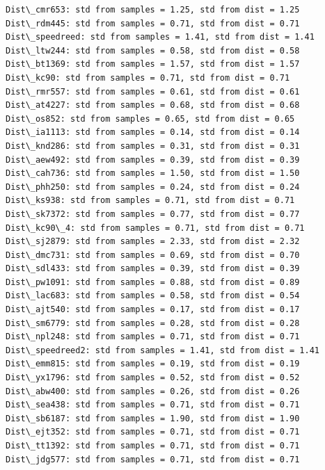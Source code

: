 \documentclass[11pt]{article}
\begin{document}
    \begin{Verbatim}[commandchars=\\\{\}]
Dist\_cmr653: std from samples = 1.25, std from dist = 1.25
Dist\_rdm445: std from samples = 0.71, std from dist = 0.71
Dist\_speedreed: std from samples = 1.41, std from dist = 1.41
Dist\_ltw244: std from samples = 0.58, std from dist = 0.58
Dist\_bt1369: std from samples = 1.57, std from dist = 1.57
Dist\_kc90: std from samples = 0.71, std from dist = 0.71
Dist\_rmr557: std from samples = 0.61, std from dist = 0.61
Dist\_at4227: std from samples = 0.68, std from dist = 0.68
Dist\_os852: std from samples = 0.65, std from dist = 0.65
Dist\_ia1113: std from samples = 0.14, std from dist = 0.14
Dist\_knd286: std from samples = 0.31, std from dist = 0.31
Dist\_aew492: std from samples = 0.39, std from dist = 0.39
Dist\_cah736: std from samples = 1.50, std from dist = 1.50
Dist\_phh250: std from samples = 0.24, std from dist = 0.24
Dist\_ks938: std from samples = 0.71, std from dist = 0.71
Dist\_sk7372: std from samples = 0.77, std from dist = 0.77
Dist\_kc90\_4: std from samples = 0.71, std from dist = 0.71
Dist\_sj2879: std from samples = 2.33, std from dist = 2.32
Dist\_dmc731: std from samples = 0.69, std from dist = 0.70
Dist\_sdl433: std from samples = 0.39, std from dist = 0.39
Dist\_pw1091: std from samples = 0.88, std from dist = 0.89
Dist\_lac683: std from samples = 0.58, std from dist = 0.54
Dist\_ajt540: std from samples = 0.17, std from dist = 0.17
Dist\_sm6779: std from samples = 0.28, std from dist = 0.28
Dist\_npl248: std from samples = 0.71, std from dist = 0.71
Dist\_speedreed2: std from samples = 1.41, std from dist = 1.41
Dist\_emm815: std from samples = 0.19, std from dist = 0.19
Dist\_yx1796: std from samples = 0.52, std from dist = 0.52
Dist\_abw400: std from samples = 0.26, std from dist = 0.26
Dist\_sea438: std from samples = 0.71, std from dist = 0.71
Dist\_sb6187: std from samples = 1.90, std from dist = 1.90
Dist\_ejt352: std from samples = 0.71, std from dist = 0.71
Dist\_tt1392: std from samples = 0.71, std from dist = 0.71
Dist\_jdg577: std from samples = 0.71, std from dist = 0.71

    \end{Verbatim}

    \begin{center}
    \end{center}
    { \hspace*{\fill} \\}
    
\end{document}
